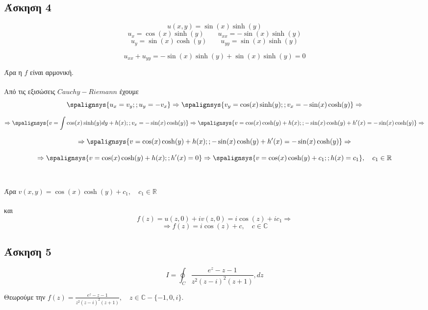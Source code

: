 \documentclass[12pt]{article}
\begin{document}
 \subsection{Άσκηση 4}

$$ u(x,y)=\sin(x)\sinh(y) $$
$$ u_x=\cos(x)\sinh(y) \qquad  u_{xx}=-\sin(x)\sinh(y)$$
$$ u_y=\sin(x)\cosh(y) \qquad  u_{yy}=\sin(x)\sinh(y) $$

$$ u_{xx}+u_{yy}=-\sin(x)\sinh(y)+\sin(x)\sinh(y)=0 $$

Άρα η $f$ είναι αρμονική.
\\ \\
Από τις εξισώσεις $Cauchy-Riemann$ έχουμε
\\
\[
\spalignsys {u_x=v_y; ;u_y=-v_x} \Rightarrow    
\spalignsys 
{v_y=\cos(x)\sinh(y); ; v_x=-\sin(x)\cosh(y)}
\Rightarrow
\]

\[
\Rightarrow
\spalignsys {v =\int \cos(x) \sinh(y)dy+h(x) ; ; v_x =-\sin(x)\cosh(y) } \Rightarrow    
\spalignsys 
{v=\cos(x)\cosh(y)+h(x); ;-\sin(x)\cosh(y)+h'(x)=-\sin(x)\cosh(y)}
\Rightarrow
\]

\[
\Rightarrow
\spalignsys {v=\cos(x)\cosh(y)+h(x) ; ;-\sin(x)\cosh(y)+h'(x)=-\sin(x)\cosh(y)}
\Rightarrow
\]

\[
\Rightarrow
\spalignsys {v=\cos(x)\cosh(y)+h(x); ; h'(x)=0 } \Rightarrow    
\spalignsys 
{v=\cos(x)\cosh(y)+c_1 ; ;  h(x)=c_1}
,\quad c_1 \in \mathbb{R}
\]
\\ \\
Άρα $ v(x,y) =\cos(x)\cosh(y)+c_1,\quad c_1 \in \mathbb{R} $
\\ \\
και
$$ f(z)=u(z,0)+iv(z,0)=i\cos(z)+i c_1 \Rightarrow$$
$$  \Rightarrow f(z)=i\cos(z)+c, \quad c\in \mathbb{C}  $$

\newpage
 \subsection{Άσκηση 5}

$$Ι=\oint_{C} \frac{e^z-z-1}{z^2(z-i)^2(z+1)} ,dz$$

Θεωρούμε την  $f(z)=\frac{e^z-z-1}{z^2(z-i)^2(z+1)},\quad z\in\mathbb{C}-\{-1,0,i\}$.


\newline
\end{document}
